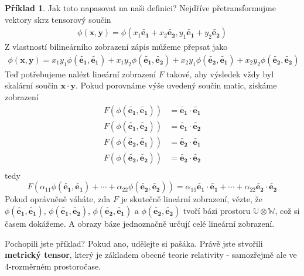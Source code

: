 \documentclass[a5paper,12pt]{amsbook}
\theoremstyle{definition}
\newtheorem{example}{Příklad}[chapter]
\newcommand{\myvec}[1]{\bm{#1}}
\newcommand{\myspace}[1]{\mathbb{#1}}
\begin{document}
\begin{example}
Jak toto napasovat na naši definici? Nejdříve přetransformujme vektory skrz tensorový součin
\begin{equation*}
\begin{split}
\phi(\myvec{x}, \myvec{y}) = \phi(x_1\myvec{\widetilde{e_1}} + x_2\myvec{\widetilde{e_2}},
  y_1\myvec{\widetilde{e_1}} + y_2\myvec{\widetilde{e_2}})
\end{split}
\end{equation*}
Z vlastností bilineárního zobrazení zápis můžeme přepsat jako
\begin{equation*}
\begin{split}
\phi(\myvec{x}, \myvec{y}) =
  x_1 y_1 \phi(\myvec{\widetilde{e_1}}, \myvec{\widetilde{e_1}})
  + x_1 y_2 \phi(\myvec{\widetilde{e_1}}, \myvec{\widetilde{e_2}})
  + x_2 y_1 \phi(\myvec{\widetilde{e_2}}, \myvec{\widetilde{e_1}})
  + x_2 y_2 \phi(\myvec{\widetilde{e_2}}, \myvec{\widetilde{e_2}})
\end{split}
\end{equation*}
Teď potřebujeme nalézt lineární zobrazení $F$ takové, aby výsledek vždy byl skalární
součin $\myvec{x}\cdot\myvec{y}$. Pokud porovnáme výše uvedený součin matic, získáme
zobrazení
\begin{equation*}
\begin{split}
F(\phi(\myvec{\widetilde{e_1}}, \myvec{\widetilde{e_1}})) &=
    \myvec{\widetilde{e_1}}\cdot\myvec{\widetilde{e_1}} \\
F(\phi(\myvec{\widetilde{e_1}}, \myvec{\widetilde{e_2}})) &=
    \myvec{\widetilde{e_1}}\cdot\myvec{\widetilde{e_2}} \\
F(\phi(\myvec{\widetilde{e_2}}, \myvec{\widetilde{e_1}})) &=
    \myvec{\widetilde{e_2}}\cdot\myvec{\widetilde{e_1}} \\
F(\phi(\myvec{\widetilde{e_2}}, \myvec{\widetilde{e_2}})) &=
    \myvec{\widetilde{e_2}}\cdot\myvec{\widetilde{e_2}} \\
\end{split}
\end{equation*}
tedy
\begin{equation*}
F(\alpha_{11}\phi(\myvec{\widetilde{e_1}}, \myvec{\widetilde{e_1}}) + \cdots 
  + \alpha_{22}\phi(\myvec{\widetilde{e_2}}, \myvec{\widetilde{e_2}})) 
= \alpha_{11}\myvec{\widetilde{e_1}}\cdot\myvec{\widetilde{e_1}} + \cdots
  + \alpha_{22}\myvec{\widetilde{e_2}}\cdot\myvec{\widetilde{e_2}}
\end{equation*}
Pokud oprávněně váháte, zda $F$ je skutečně lineární zobrazení, vězte, že
$\phi(\myvec{\widetilde{e_1}}, \myvec{\widetilde{e_1}})$, 
$\phi(\myvec{\widetilde{e_1}}, \myvec{\widetilde{e_2}})$,
$\phi(\myvec{\widetilde{e_2}}, \myvec{\widetilde{e_1}})$ a
$\phi(\myvec{\widetilde{e_2}}, \myvec{\widetilde{e_2}})$ tvoří bázi prostoru
$\myspace{U}\otimes\myspace{W}$, což si časem dokážeme. A obrazy báze jednoznačně
určují celé lineární zobrazení.

\medskip\noindent
Pochopili jste příklad? Pokud ano, udělejte si pašáka. Právě jste stvořili
\textbf{metrický tensor}, který je základem obecné teorie relativity - samozřejmě
ale ve 4-rozměrném prostoročase.
\end{example}
\end{document}

